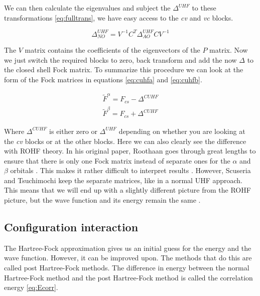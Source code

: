 We can then calculate the eigenvalues and subject the $\Delta^{UHF}$ to these transformations \eqref{eq:fulltrans}, we have easy access to the \textit{cv} and \textit{vc} blocks.

\begin{equation}\label{eq:fulltrans}
  \Delta_{NO}^{UHF} = V^{-1} C^T \Delta^{UHF}_{AO} C V^{-1}
\end{equation}

The $V$ matrix contains the coefficients of the eigenvectors of the $P$ matrix. Now we just switch the required blocks to zero, back transform and add the now $\Delta$ to the closed
shell Fock matrix. To summarize this procedure we can look at the form of the Fock matrices in equations \eqref{eq:cuhfa} and \eqref{eq:cuhfb}.

\begin{subequations}
  \begin{align}
    \label{eq:cuhfa}
    \tilde{F}^\alpha = F_{cs} - \Delta^{CUHF} \\
    \label{eq:cuhfb}
    \tilde{F}^\beta = F_{cs} + \Delta^{CUHF}
  \end{align}
\end{subequations}

Where $\Delta^{CUHF}$ is either zero or $\Delta^{UHF}$ depending on whether you are looking at the \textit{cv} blocks or at the other blocks. Here we can also clearly see the
difference with ROHF theory. In his original paper, Roothaan goes through great lengths to ensure that there is only one Fock matrix instead of separate ones for the $\alpha$ and
$\beta$ orbitals \cite{Roothaan1960}. This makes it rather difficult to interpret results \cite{Scuseria2010}. However, Scuseria and Tsuchimochi keep the separate matrices, like in a
normal UHF approach. This means that we will end up with a slightly different picture from the ROHF picture, but the wave function and its energy remain the same \cite{Scuseria2010}.

\subsection{Configuration interaction}
\label{subsec:cistheory}

The Hartree-Fock approximation gives us an initial guess for the energy and the wave function. However, it can be improved upon. The methods that do this are called post Hartree-Fock
methods. The difference in energy between the normal Hartree-Fock method and the post Hartree-Fock method is called the correlation energy \eqref{eq:Ecorr}.

